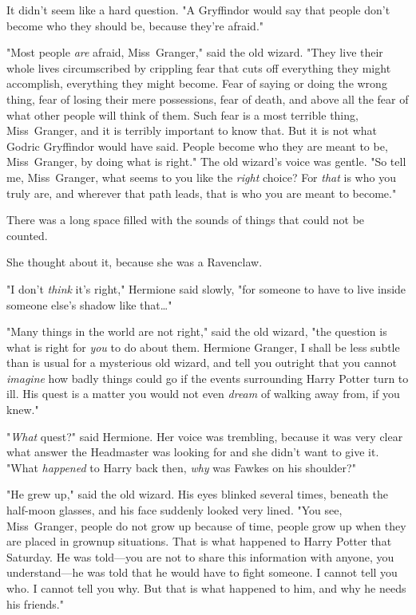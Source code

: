 It didn't seem like a hard question. "A Gryffindor would say that people don't
become who they should be, because they're afraid."

"Most people \emph{are} afraid, Miss~Granger," said the old wizard. "They live
their whole lives circumscribed by crippling fear that cuts off everything they
might accomplish, everything they might become. Fear of saying or doing the
wrong thing, fear of losing their mere possessions, fear of death, and above
all the fear of what other people will think of them. Such fear is a most
terrible thing, Miss~Granger, and it is terribly important to know that. But it
is not what Godric Gryffindor would have said. People become who they are meant
to be, Miss~Granger, by doing what is right." The old wizard's voice was
gentle. "So tell me, Miss~Granger, what seems to you like the \emph{right}
choice? For \emph{that} is who you truly are, and wherever that path leads,
that is who you are meant to become."

There was a long space filled with the sounds of things that could not be
counted.

She thought about it, because she was a Ravenclaw.

"I don't \emph{think} it's right," Hermione said slowly, "for someone to have
to live inside someone else's shadow like that…"

"Many things in the world are not right," said the old wizard, "the question is
what is right for \emph{you} to do about them. Hermione Granger, I shall be
less subtle than is usual for a mysterious old wizard, and tell you outright
that you cannot \emph{imagine} how badly things could go if the events
surrounding Harry Potter turn to ill. His quest is a matter you would not even
\emph{dream} of walking away from, if you knew."

"\emph{What} quest?" said Hermione. Her voice was trembling, because it was
very clear what answer the Headmaster was looking for and she didn't want to
give it. "What \emph{happened} to Harry back then, \emph{why} was Fawkes on his
shoulder?"

"He grew up," said the old wizard. His eyes blinked several times, beneath the
half-moon glasses, and his face suddenly looked very lined. "You see,
Miss~Granger, people do not grow up because of time, people grow up when they are
placed in grownup situations. That is what happened to Harry Potter that
Saturday. He was told---you are not to share this information with anyone, you
understand---he was told that he would have to fight someone. I cannot tell you
who. I cannot tell you why. But that is what happened to him, and why he needs
his friends."

